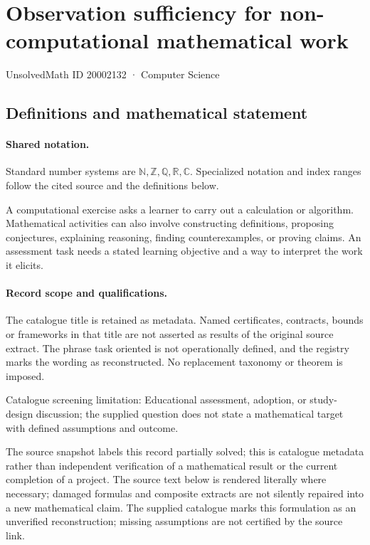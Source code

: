 \documentclass[11pt]{article}
\begin{document}
\setcounter{section}{20002131}
\section{Observation sufficiency for non-computational mathematical work}\label{20002132}
{\small\sffamily UnsolvedMath ID 20002132 · Computer Science}
\subsection{Definitions and mathematical statement}

\paragraph{Shared notation.}Standard number systems are $\mathbb N,\mathbb Z,\mathbb Q,\mathbb R,\mathbb C$. Specialized notation and index ranges follow the cited source and the definitions below.


A computational exercise asks a learner to carry out a calculation or algorithm. Mathematical activities can also involve constructing definitions, proposing conjectures, explaining reasoning, finding counterexamples, or proving claims. An assessment task needs a stated learning objective and a way to interpret the work it elicits.
\paragraph{Record scope and qualifications.}
The catalogue title is retained as metadata. Named certificates, contracts, bounds or frameworks in that title are not asserted as results of the original source extract.
The phrase task oriented is not operationally defined, and the registry marks the wording as reconstructed. No replacement taxonomy or theorem is imposed.

Catalogue screening limitation: Educational assessment, adoption, or study-design discussion; the supplied question does not state a mathematical target with defined assumptions and outcome.

The source snapshot labels this record partially solved; this is catalogue metadata rather than independent verification of a mathematical result or the current completion of a project.
The source text below is rendered literally where necessary; damaged formulas and composite extracts are not silently repaired into a new mathematical claim.
The supplied catalogue marks this formulation as an unverified reconstruction; missing assumptions are not certified by the source link.
\end{document}

